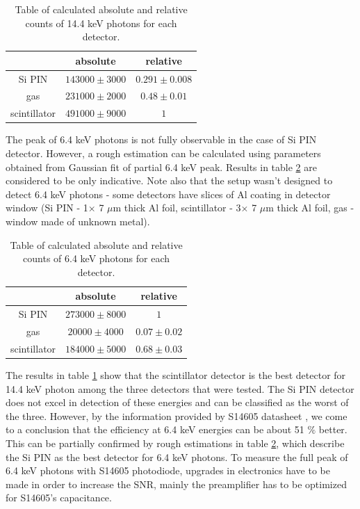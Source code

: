 \begin{table}[H]
\centering
\begin{tabular}{|c|c|c|}
\hline
   & absolute & relative \\ \hline
Si PIN & $143000 \pm 3000$    & $0.291 \pm 0.008$  \\ \hline
gas & $231000 \pm 2000$    & $0.48 \pm  0.01$ \\ \hline
scintillator  & $491000 \pm 9000$    & $1$ \\ \hline
\end{tabular}
\caption{Table of calculated absolute and relative counts of 14.4 keV photons for each detector.}
 \label{144kevEFF}
\end{table}


The peak of 6.4 keV photons is not fully observable in the case of Si PIN detector. However, a rough estimation can be calculated using parameters obtained from Gaussian fit of partial 6.4 keV peak. Results in table \ref{64kevEFF} are considered to be only indicative. Note also that the setup wasn't designed to detect 6.4 keV photons - some detectors have slices of Al coating in detector window (Si PIN - 1$\times$ 7 $\mu$m thick Al foil, scintillator - 3$\times$ 7 $\mu$m thick Al foil, gas - window made of unknown metal).  

\begin{table}[H]
\centering
\begin{tabular}{|c|c|c|}
\hline
   & absolute & relative \\ \hline
Si PIN & $273000 \pm 8000$    & $1$  \\ \hline
gas & $20000 \pm 4000$    & $0.07 \pm 0.02$ \\ \hline
scintillator  & $184000 \pm 5000$    & $0.68 \pm 0.03$ \\ \hline
\end{tabular}
\caption{Table of calculated absolute and relative counts of 6.4 keV photons for each detector.}
 \label{64kevEFF}
\end{table}


\par
The results in table \ref{144kevEFF} show that the scintillator detector is the best detector for 14.4 keV photon among the three detectors that were tested. The Si PIN detector does not excel in detection of these energies and can be classified as the worst of the three. However, by the information provided by S14605 datasheet \cite{datS14605}, we come to a conclusion that the efficiency at 6.4 keV energies can be about 51 $\%$ better. This can be partially confirmed by rough estimations in table \ref{64kevEFF}, which describe the Si PIN as the best detector for 6.4 keV photons. To measure the full peak of 6.4 keV photons with S14605 photodiode, upgrades in electronics have to be made in order to increase the SNR, mainly the preamplifier has to be optimized for S14605's capacitance.



